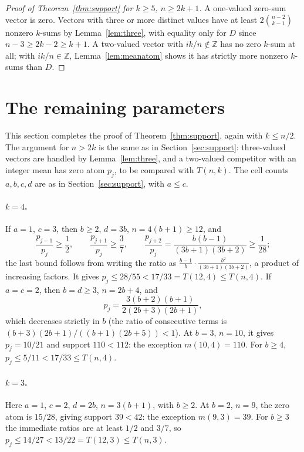 \documentclass[11pt]{article}
\theoremstyle{remark}
\newcommand{\Z}{\mathbb Z}
\begin{document}
\begin{proof}[Proof of Theorem~\ref{thm:support} for \(k\ge5\), \(n\ge2k+1\)]
A one-valued zero-sum vector is zero. Vectors with three or more distinct
values have at least \(2\binom{n-2}{k-1}\) nonzero \(k\)-sums by
Lemma~\ref{lem:three}, with equality only for \(D\) since
\(n-3\ge2k-2\ge k+1\). A two-valued vector with \(ik/n\notin\Z\) has no zero
\(k\)-sum at all; with \(ik/n\in\Z\), Lemma~\ref{lem:meanatom} shows it has
strictly more nonzero \(k\)-sums than \(D\).
\end{proof}

\section{The remaining parameters}\label{sec:small}

This section completes the proof of Theorem~\ref{thm:support}, again with
\(k\le n/2\). The argument for \(n>2k\) is the same as in
Section~\ref{sec:support}: three-valued vectors are handled by
Lemma~\ref{lem:three}, and a two-valued competitor with an integer mean has
zero atom \(p_j\), to be compared with \(T(n,k)\). The cell counts
\(a,b,c,d\) are as in Section~\ref{sec:support}, with \(a\le c\).

\paragraph{\(k=4\).}
If \(a=1\), \(c=3\), then \(b\ge2\), \(d=3b\), \(n=4(b+1)\ge12\), and
\[
 \frac{p_{j-1}}{p_j}\ge\frac12,\qquad
 \frac{p_{j+1}}{p_j}\ge\frac37,\qquad
 \frac{p_{j+2}}{p_j}=\frac{b(b-1)}{(3b+1)(3b+2)}\ge\frac1{28};
\]
the last bound follows from writing the ratio as
\(\frac{b-1}{b}\cdot\frac{b^2}{(3b+1)(3b+2)}\), a product of increasing
factors. It gives \(p_j\le28/55<17/33=T(12,4)\le T(n,4)\).
If \(a=c=2\), then \(b=d\ge3\), \(n=2b+4\), and
\[
 p_j=\frac{3(b+2)(b+1)}{2(2b+3)(2b+1)} ,
\]
which decreases strictly in \(b\) (the ratio of consecutive terms is
\((b+3)(2b+1)/((b+1)(2b+5))<1\)). At \(b=3\), \(n=10\), it gives
\(p_j=10/21\) and support \(110<112\): the exception \(m(10,4)=110\). For
\(b\ge4\), \(p_j\le5/11<17/33\le T(n,4)\).

\paragraph{\(k=3\).}
Here \(a=1\), \(c=2\), \(d=2b\), \(n=3(b+1)\), with \(b\ge2\). At \(b=2\),
\(n=9\), the zero atom is \(15/28\), giving support \(39<42\): the exception
\(m(9,3)=39\). For \(b\ge3\) the immediate ratios are at least \(1/2\) and
\(3/7\), so \(p_j\le14/27<13/22=T(12,3)\le T(n,3)\).
\end{document}
